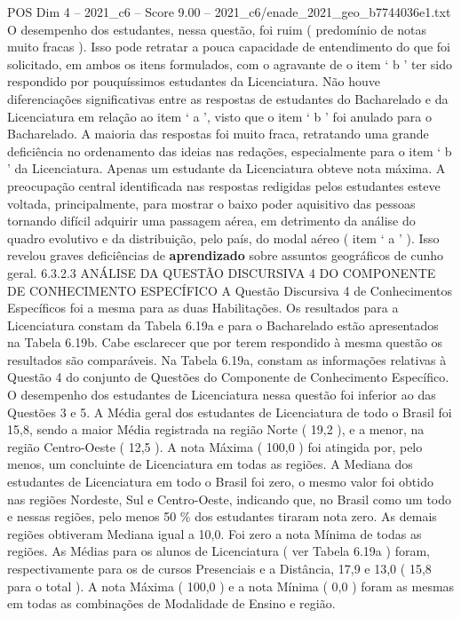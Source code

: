 \begin{textsample}{POS Dim 4 – 2021\_c6 – Score 9.00 – 2021\_c6/enade\_2021\_geo\_b7744036e1.txt}
O desempenho dos estudantes, nessa questão, foi ruim ( predomínio de notas muito fracas ).
Isso pode retratar a pouca capacidade de entendimento do que foi solicitado, em ambos os itens formulados, com o agravante de o item ‘ b ’ ter sido respondido por pouquíssimos estudantes da Licenciatura.
Não houve diferenciações significativas entre as respostas de estudantes do Bacharelado e da Licenciatura em relação ao item ‘ a ’, visto que o item ‘ b ’ foi anulado para o Bacharelado.
A maioria das respostas foi muito fraca, retratando uma grande deficiência no ordenamento das ideias nas redações, especialmente para o item ‘ b ’ da Licenciatura.
Apenas um estudante da Licenciatura obteve nota máxima.
A preocupação central identificada nas respostas redigidas pelos estudantes esteve voltada, principalmente, para mostrar o baixo poder aquisitivo das pessoas tornando difícil adquirir uma passagem aérea, em detrimento da análise do quadro evolutivo e da distribuição, pelo país, do modal aéreo ( item ‘ a ’ ).
Isso revelou graves deficiências de \textbf{aprendizado} sobre assuntos geográficos de cunho geral. 6.3.2.3 ANÁLISE DA QUESTÃO DISCURSIVA 4 DO COMPONENTE DE CONHECIMENTO ESPECÍFICO A Questão Discursiva 4 de Conhecimentos Específicos foi a mesma para as duas Habilitações.
Os resultados para a Licenciatura constam da Tabela 6.19a e para o Bacharelado estão apresentados na Tabela 6.19b.
Cabe esclarecer que por terem respondido à mesma questão os resultados são comparáveis.
Na Tabela 6.19a, constam as informações relativas à Questão 4 do conjunto de Questões do Componente de Conhecimento Específico.
O desempenho dos estudantes de Licenciatura nessa questão foi inferior ao das Questões 3 e 5.
A Média geral dos estudantes de Licenciatura de todo o Brasil foi 15,8, sendo a maior Média registrada na região Norte ( 19,2 ), e a menor, na região Centro-Oeste ( 12,5 ).
A nota Máxima ( 100,0 ) foi atingida por, pelo menos, um concluinte de Licenciatura em todas as regiões.
A Mediana dos estudantes de Licenciatura em todo o Brasil foi zero, o mesmo valor foi obtido nas regiões Nordeste, Sul e Centro-Oeste, indicando que, no Brasil como um todo e nessas regiões, pelo menos 50 \% dos estudantes tiraram nota zero.
As demais regiões obtiveram Mediana igual a 10,0.
Foi zero a nota Mínima de todas as regiões.
As Médias para os alunos de Licenciatura ( ver Tabela 6.19a ) foram, respectivamente para os de cursos Presenciais e a Distância, 17,9 e 13,0 ( 15,8 para o total ).
A nota Máxima ( 100,0 ) e a nota Mínima ( 0,0 ) foram as mesmas em todas as combinações de Modalidade de Ensino e região.

\end{textsample}
